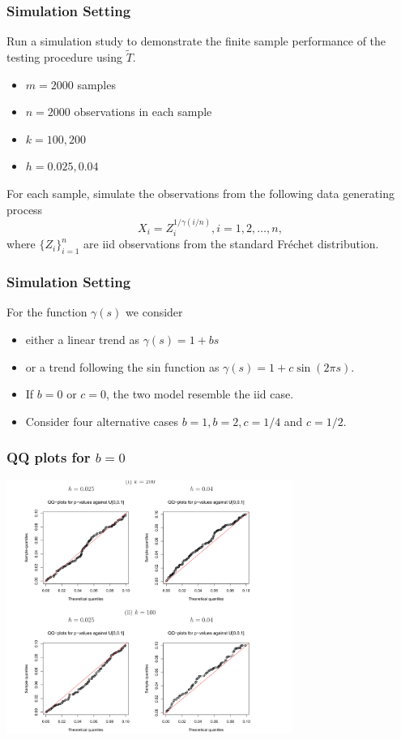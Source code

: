 \documentclass{beamer}
\begin{document}
\begin{frame}
    \frametitle{Simulation Setting}
Run a simulation study to demonstrate the finite sample performance of the testing procedure using $\tilde{T}$.

\begin{itemize}
    \item $m=2000$ samples
    \item  $n=2000$ observations in each sample
    \item  $k=100,200$
    \item  $h=0.025,0.04$
\end{itemize}
  
    
    For each sample,  simulate the observations from the following data generating process
    $$
    X_i=Z_i^{1/\gamma(i/n)}, i=1,2,\dots,n,
    $$
    where $\{Z_i\}_{i=1}^n$ are iid observations from the standard Fr\'echet distribution.
\end{frame}

\begin{frame}
    \frametitle{Simulation Setting}
    For the function $\gamma(s)$ we consider 
    \begin{itemize}
        \item  either a linear trend as $\gamma(s)=1+bs$
        \item  or a trend following the sin function as $\gamma(s)=1+c\sin(2\pi s)$.
        \item 
        If $b=0$ or $c=0$, the two model resemble the iid case.
        \item     
        Consider four alternative cases $b=1, b=2, c=1/4$ and $c=1/2$.
    \end{itemize}
\end{frame}



\begin{frame}
    \frametitle{QQ plots for $b=0$}
\begin{center}
    \includegraphics[width=0.7\textwidth]{QQ.png}
\end{center}
\end{frame}
\end{document}
